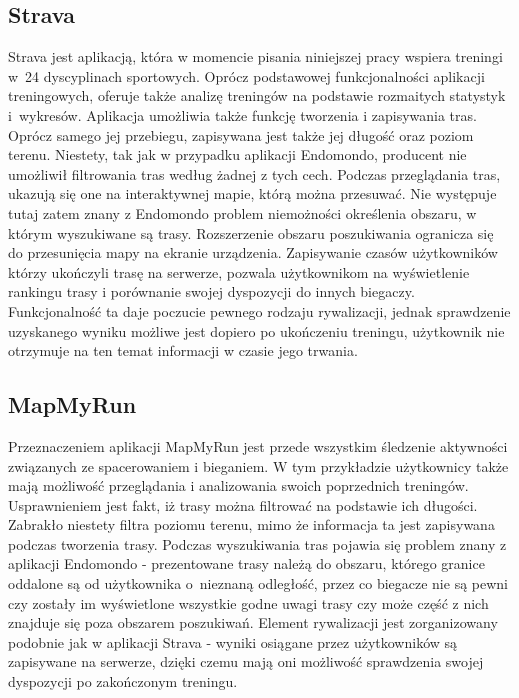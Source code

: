 \subsection{Strava}
Strava \cite{strava} jest aplikacją, która w momencie pisania niniejszej pracy wspiera treningi w~24 dyscyplinach sportowych. Oprócz podstawowej funkcjonalności aplikacji treningowych, oferuje także analizę treningów na podstawie rozmaitych statystyk i~wykresów. Aplikacja umożliwia także funkcję tworzenia i zapisywania tras. Oprócz samego jej przebiegu, zapisywana jest także jej długość oraz poziom terenu. Niestety, tak jak w przypadku aplikacji Endomondo, producent nie umożliwił filtrowania tras według żadnej z tych cech. Podczas przeglądania tras, ukazują się one na interaktywnej mapie, którą można przesuwać. Nie występuje tutaj zatem znany z Endomondo problem niemożności określenia obszaru, w którym wyszukiwane są trasy. Rozszerzenie obszaru poszukiwania ogranicza się do przesunięcia mapy na ekranie urządzenia. Zapisywanie czasów użytkowników którzy ukończyli trasę na serwerze, pozwala użytkownikom na wyświetlenie rankingu trasy i porównanie swojej dyspozycji do innych biegaczy. Funkcjonalność ta daje poczucie pewnego rodzaju rywalizacji, jednak sprawdzenie uzyskanego wyniku możliwe jest dopiero po ukończeniu treningu, użytkownik nie otrzymuje na ten temat informacji w czasie jego trwania.
\subsection{MapMyRun}
Przeznaczeniem aplikacji MapMyRun \cite{mapmyrun} jest przede wszystkim śledzenie aktywności związanych ze spacerowaniem i bieganiem. W tym przykładzie użytkownicy także mają możliwość przeglądania i analizowania swoich poprzednich treningów. Usprawnieniem jest fakt, iż trasy można filtrować na podstawie ich długości. Zabrakło niestety filtra poziomu terenu, mimo że informacja ta jest zapisywana podczas tworzenia trasy. Podczas wyszukiwania tras pojawia się problem znany z aplikacji Endomondo - prezentowane trasy należą do obszaru, którego granice oddalone są od użytkownika o~nieznaną odległość, przez co biegacze nie są pewni czy zostały im wyświetlone wszystkie godne uwagi trasy czy może część z nich znajduje się poza obszarem poszukiwań. Element rywalizacji jest zorganizowany podobnie jak w aplikacji Strava - wyniki osiągane przez użytkowników są zapisywane na serwerze, dzięki czemu mają oni możliwość sprawdzenia swojej dyspozycji po zakończonym treningu.